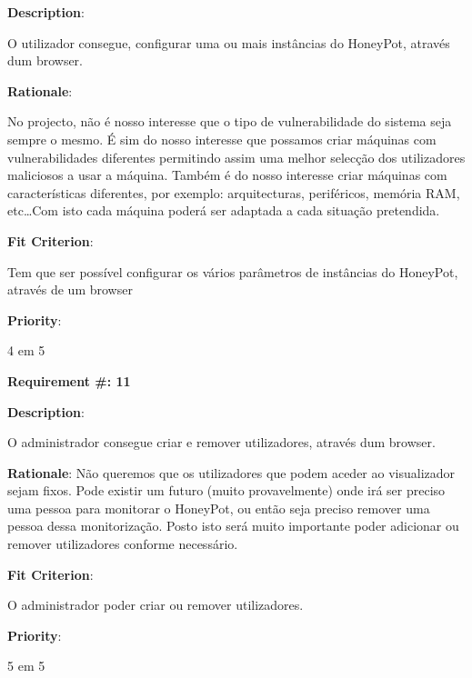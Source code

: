 \begin{description}
\item \textbf{Description}:

O utilizador consegue, configurar uma ou mais instâncias do HoneyPot, através dum browser.

\item \textbf{Rationale}:

No projecto, não é nosso interesse que o tipo de vulnerabilidade do sistema seja sempre o mesmo. É sim do nosso interesse que possamos criar
máquinas com vulnerabilidades diferentes permitindo assim uma melhor selecção dos utilizadores maliciosos a usar a máquina. Também é do nosso interesse
criar máquinas com características diferentes, por exemplo: arquitecturas, periféricos, memória RAM, etc\ldots Com isto cada máquina poderá ser adaptada
a cada situação pretendida.

\item \textbf{Fit Criterion}:

Tem que ser possível configurar os vários parâmetros de instâncias do HoneyPot, através de um browser

\item \textbf{Priority}:

4 em 5

\end{description}

\pagebreak






\begin{minipage}{0.55\textwidth}
\begin{flushleft}\textbf{Requirement \#: 11}\end{flushleft}
\end{minipage}
\begin{minipage}{0.4\textwidth}
\end{minipage}

\begin{description}
\item \textbf{Description}:

O administrador consegue criar e remover utilizadores, através dum browser.


\item \textbf{Rationale}:
Não queremos que os utilizadores que podem aceder ao visualizador sejam fixos. Pode existir um futuro (muito provavelmente) onde irá ser preciso
uma pessoa para monitorar o HoneyPot, ou então seja preciso remover uma pessoa dessa monitorização. Posto isto será muito importante poder adicionar
ou remover utilizadores conforme necessário.

\item \textbf{Fit Criterion}:

O administrador poder criar ou remover utilizadores.

\item \textbf{Priority}:

5 em 5

\end{description}

